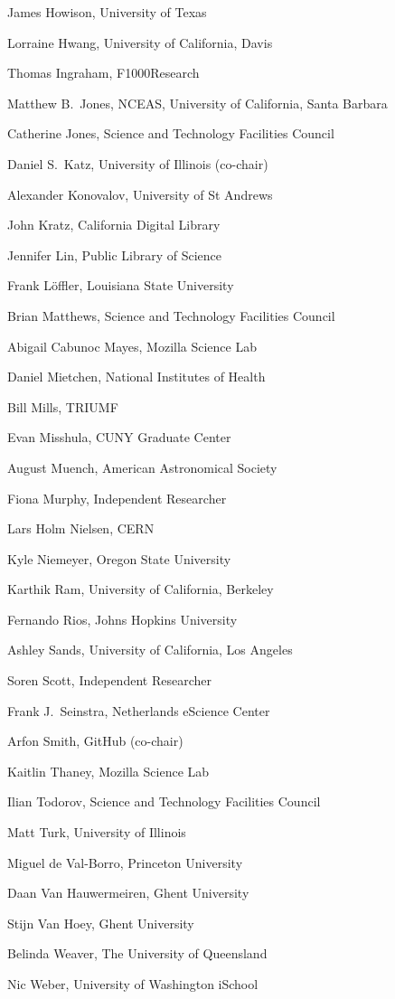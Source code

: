 \documentclass[11pt, oneside]{amsart}
\begin{document}
James Howison, University of Texas

Lorraine Hwang, University of California,  Davis

Thomas Ingraham, F1000Research

Matthew B.~Jones, NCEAS, University of California,  Santa Barbara

Catherine Jones, Science and Technology Facilities Council

Daniel S.~Katz, University of Illinois (co-chair)

Alexander Konovalov, University of St Andrews

John Kratz, California Digital Library

Jennifer Lin, Public Library of Science

Frank L\"offler, Louisiana State University

Brian Matthews, Science and Technology Facilities Council

Abigail Cabunoc Mayes, Mozilla Science Lab

Daniel Mietchen, National Institutes of Health

Bill Mills, TRIUMF

Evan Misshula, CUNY Graduate Center

August Muench, American Astronomical Society

Fiona Murphy, Independent Researcher

Lars Holm Nielsen, CERN

Kyle Niemeyer, Oregon State University

Karthik Ram, University of California, Berkeley

Fernando Rios, Johns Hopkins University

Ashley Sands, University of California, Los Angeles

Soren Scott, Independent Researcher

Frank J.~Seinstra, Netherlands eScience Center

Arfon Smith, GitHub (co-chair)

Kaitlin Thaney, Mozilla Science Lab

Ilian Todorov, Science and Technology Facilities Council

Matt Turk, University of Illinois

Miguel de Val-Borro, Princeton University

Daan Van Hauwermeiren, Ghent University

Stijn Van Hoey, Ghent University

Belinda Weaver, The University of Queensland

Nic Weber, University of Washington iSchool



\end{document}
